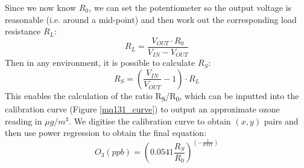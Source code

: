 \documentclass[11pt,twosided,a4paper]{report}
\begin{document}
Since we now know $R_0$, we can set the potentiometer so the output voltage is reasonable (i.e. around a mid-point) and then work out the corresponding load resistance $R_L$:
\begin{equation}
R_L = \frac{V_{OUT} \cdot R_0}{V_{IN} - V_{OUT}}
\end{equation}
Then in any environment, it is possible to calculate $R_S$:
\begin{equation}
R_S = (\frac{V_{IN}}{V_{OUT}} - 1) \cdot R_L
\end{equation}
This enables the calculation of the ratio R\textsubscript{S}/R\textsubscript{0}, which can be inputted into the calibration curve (Figure \ref{mq131_curve}) to output an approximate ozone reading in $\mu g/m^3$. We digitise the calibration curve to obtain $(x, y)$ pairs and then use power regression to obtain the final equation:
\begin{equation}
O_3 (ppb) = (0.0541 \frac{R_S}{R_0}) ^ {(-\frac{1}{0.917})}
\end{equation}
\end{document}
